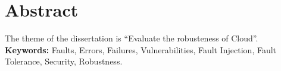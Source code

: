 \newpage
{}

\section*{Abstract}

The theme of the dissertation is ``Evaluate the robusteness of Cloud''.\\

\textbf{Keywords:} Faults, Errors, Failures, Vulnerabilities, Fault Injection, Fault Tolerance, Security, Robustness.
